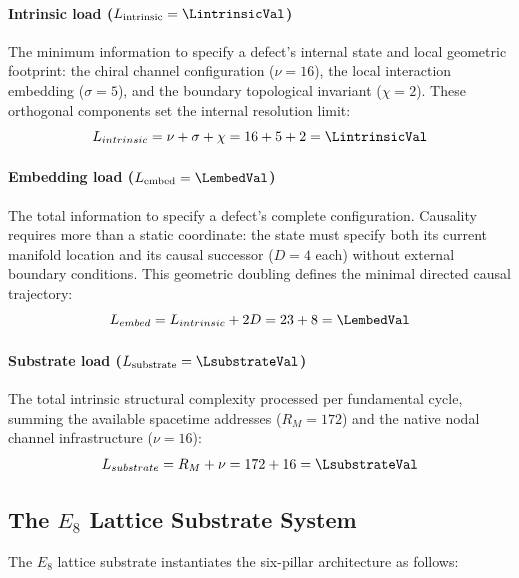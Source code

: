 \paragraph{Intrinsic load ($L_{\text{intrinsic}} = \LintrinsicVal$)}  
\label{par:lintrinsic}
The minimum information to specify a defect's internal state and local geometric footprint: the chiral channel configuration ($\nu = 16$), the local interaction embedding ($\sigma = 5$), and the boundary topological invariant ($\chi = 2$).  These orthogonal components set the internal resolution limit:
\begin{equation}
    L_{intrinsic} = \nu + \sigma + \chi = 16 + 5 + 2 = \mathbf{\LintrinsicVal}
\end{equation}

\paragraph{Embedding load ($L_{\text{embed}} = \LembedVal$)}
\label{par:lembed}
The total information to specify a defect's complete configuration. Causality requires more than a static coordinate: the state must specify both its current manifold location and its causal successor ($D=4$ each) without external boundary conditions. This geometric doubling defines the minimal directed causal trajectory:
\begin{equation}
    L_{embed} = L_{intrinsic} + 2D = 23 + 8 = \mathbf{\LembedVal}
\end{equation}

\paragraph{Substrate load ($L_{\text{substrate}} = \LsubstrateVal$)}  
\label{par:lsubstrate}
The total intrinsic structural complexity processed per fundamental cycle, summing the available spacetime addresses ($R_M = 172$) and the native nodal channel infrastructure ($\nu = 16$):
\begin{equation}
    L_{substrate} = R_M + \nu = 172 + 16 = \mathbf{\LsubstrateVal}
\end{equation}

\subsection{The \texorpdfstring{$E_8$}{E8} Lattice Substrate System}
\label{sec:system1spec}

The $E_8$ lattice substrate instantiates the six-pillar architecture as follows:

